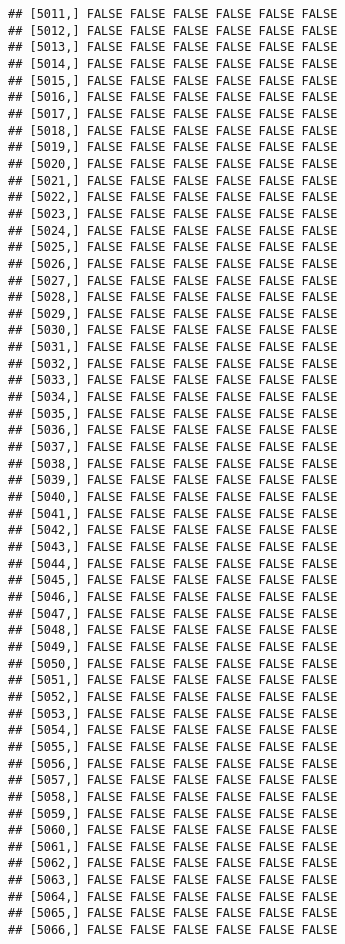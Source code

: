 \documentclass[
]{article}
\begin{document}
\begin{verbatim}
## [5011,] FALSE FALSE FALSE FALSE FALSE FALSE
## [5012,] FALSE FALSE FALSE FALSE FALSE FALSE
## [5013,] FALSE FALSE FALSE FALSE FALSE FALSE
## [5014,] FALSE FALSE FALSE FALSE FALSE FALSE
## [5015,] FALSE FALSE FALSE FALSE FALSE FALSE
## [5016,] FALSE FALSE FALSE FALSE FALSE FALSE
## [5017,] FALSE FALSE FALSE FALSE FALSE FALSE
## [5018,] FALSE FALSE FALSE FALSE FALSE FALSE
## [5019,] FALSE FALSE FALSE FALSE FALSE FALSE
## [5020,] FALSE FALSE FALSE FALSE FALSE FALSE
## [5021,] FALSE FALSE FALSE FALSE FALSE FALSE
## [5022,] FALSE FALSE FALSE FALSE FALSE FALSE
## [5023,] FALSE FALSE FALSE FALSE FALSE FALSE
## [5024,] FALSE FALSE FALSE FALSE FALSE FALSE
## [5025,] FALSE FALSE FALSE FALSE FALSE FALSE
## [5026,] FALSE FALSE FALSE FALSE FALSE FALSE
## [5027,] FALSE FALSE FALSE FALSE FALSE FALSE
## [5028,] FALSE FALSE FALSE FALSE FALSE FALSE
## [5029,] FALSE FALSE FALSE FALSE FALSE FALSE
## [5030,] FALSE FALSE FALSE FALSE FALSE FALSE
## [5031,] FALSE FALSE FALSE FALSE FALSE FALSE
## [5032,] FALSE FALSE FALSE FALSE FALSE FALSE
## [5033,] FALSE FALSE FALSE FALSE FALSE FALSE
## [5034,] FALSE FALSE FALSE FALSE FALSE FALSE
## [5035,] FALSE FALSE FALSE FALSE FALSE FALSE
## [5036,] FALSE FALSE FALSE FALSE FALSE FALSE
## [5037,] FALSE FALSE FALSE FALSE FALSE FALSE
## [5038,] FALSE FALSE FALSE FALSE FALSE FALSE
## [5039,] FALSE FALSE FALSE FALSE FALSE FALSE
## [5040,] FALSE FALSE FALSE FALSE FALSE FALSE
## [5041,] FALSE FALSE FALSE FALSE FALSE FALSE
## [5042,] FALSE FALSE FALSE FALSE FALSE FALSE
## [5043,] FALSE FALSE FALSE FALSE FALSE FALSE
## [5044,] FALSE FALSE FALSE FALSE FALSE FALSE
## [5045,] FALSE FALSE FALSE FALSE FALSE FALSE
## [5046,] FALSE FALSE FALSE FALSE FALSE FALSE
## [5047,] FALSE FALSE FALSE FALSE FALSE FALSE
## [5048,] FALSE FALSE FALSE FALSE FALSE FALSE
## [5049,] FALSE FALSE FALSE FALSE FALSE FALSE
## [5050,] FALSE FALSE FALSE FALSE FALSE FALSE
## [5051,] FALSE FALSE FALSE FALSE FALSE FALSE
## [5052,] FALSE FALSE FALSE FALSE FALSE FALSE
## [5053,] FALSE FALSE FALSE FALSE FALSE FALSE
## [5054,] FALSE FALSE FALSE FALSE FALSE FALSE
## [5055,] FALSE FALSE FALSE FALSE FALSE FALSE
## [5056,] FALSE FALSE FALSE FALSE FALSE FALSE
## [5057,] FALSE FALSE FALSE FALSE FALSE FALSE
## [5058,] FALSE FALSE FALSE FALSE FALSE FALSE
## [5059,] FALSE FALSE FALSE FALSE FALSE FALSE
## [5060,] FALSE FALSE FALSE FALSE FALSE FALSE
## [5061,] FALSE FALSE FALSE FALSE FALSE FALSE
## [5062,] FALSE FALSE FALSE FALSE FALSE FALSE
## [5063,] FALSE FALSE FALSE FALSE FALSE FALSE
## [5064,] FALSE FALSE FALSE FALSE FALSE FALSE
## [5065,] FALSE FALSE FALSE FALSE FALSE FALSE
## [5066,] FALSE FALSE FALSE FALSE FALSE FALSE

\end{verbatim}
\end{document}
